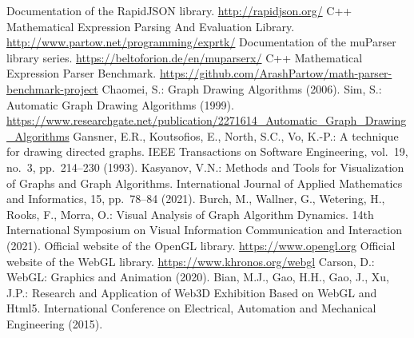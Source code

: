 \begin{thebibliography}{}
Documentation of the RapidJSON library. \url{http://rapidjson.org/}
C++ Mathematical Expression Parsing And Evaluation Library. \url{http://www.partow.net/programming/exprtk/}
Documentation of the muParser library series. \url{https://beltoforion.de/en/muparserx/}
C++ Mathematical Expression Parser Benchmark. \url{https://github.com/ArashPartow/math-parser-benchmark-project}
Chaomei, S.:
Graph Drawing Algorithms (2006).
Sim, S.:
Automatic Graph Drawing Algorithms (1999). \url{https://www.researchgate.net/publication/2271614\_Automatic\_Graph\_Drawing\_Algorithms}
Gansner, E.R., Koutsofios, E., North, S.C., Vo, K.-P.:
A technique for drawing directed graphs. IEEE Transactions on Software Engineering, vol.~19, no.~3, pp.~214--230 (1993). 
Kasyanov, V.N.:
Methods and Tools for Visualization of Graphs and Graph Algorithms. International Journal of Applied Mathematics and Informatics, 15, pp.~78--84 (2021). 
Burch, M., Wallner, G., Wetering, H., Rooks, F., Morra, O.:
Visual Analysis of Graph Algorithm Dynamics. 14th International Symposium on Visual Information Communication and Interaction (2021). 
Official website of the OpenGL library. \url{https://www.opengl.org}
Official website of the WebGL library. \url{https://www.khronos.org/webgl}
Carson, D.:
WebGL: Graphics and Animation (2020).
Bian, M.J., Gao, H.H., Gao, J., Xu, J.P.:
Research and Application of Web3D Exhibition Based on WebGL and Html5. International Conference on Electrical, Automation and Mechanical Engineering (2015).

\end{thebibliography}
